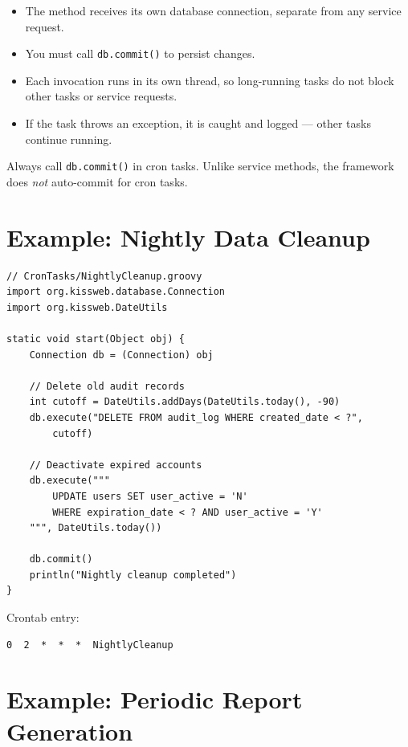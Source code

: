 \begin{itemize}
  \item The method receives its own database connection, separate from any service request.
  \item You must call \texttt{db.commit()} to persist changes.
  \item Each invocation runs in its own thread, so long-running tasks do not block other tasks or service requests.
  \item If the task throws an exception, it is caught and logged --- other tasks continue running.
\end{itemize}

\begin{warnbox}
Always call \texttt{db.commit()} in cron tasks.  Unlike service methods, the framework does \emph{not} auto-commit for cron tasks.
\end{warnbox}

\section{Example: Nightly Data Cleanup}
\label{sec:cron-cleanup}

\begin{lstlisting}[style=groovy]
// CronTasks/NightlyCleanup.groovy
import org.kissweb.database.Connection
import org.kissweb.DateUtils

static void start(Object obj) {
    Connection db = (Connection) obj

    // Delete old audit records
    int cutoff = DateUtils.addDays(DateUtils.today(), -90)
    db.execute("DELETE FROM audit_log WHERE created_date < ?",
        cutoff)

    // Deactivate expired accounts
    db.execute("""
        UPDATE users SET user_active = 'N'
        WHERE expiration_date < ? AND user_active = 'Y'
    """, DateUtils.today())

    db.commit()
    println("Nightly cleanup completed")
}
\end{lstlisting}

\noindent
Crontab entry:

\begin{lstlisting}[style=ini]
0  2  *  *  *  NightlyCleanup
\end{lstlisting}

\section{Example: Periodic Report Generation}
\label{sec:cron-report}


